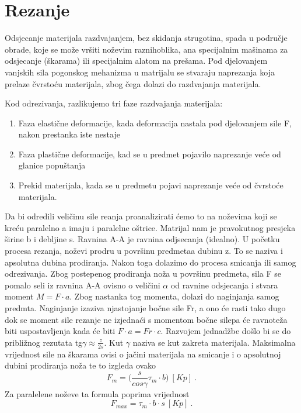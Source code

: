 \documentclass[a4paper,12pt]{article}
\numberwithin{figure}{section}
\begin{document}
\section{Rezanje}
Odsjecanje materijala razdvajanjem, bez skidanja strugotina, spada u područje obrade, koje se može vršiti noževim raznihoblika, ana specijalnim mašinama za odsjecanje (škarama) ili specijalnim alatom na prešama. Pod djelovanjem vanjskih sila pogonskog mehanizma u matrijalu se stvaraju naprezanja koja prelaze čvrstoću materijala, zbog čega dolazi do razdvajanja materijala. \par
Kod odrezivanja, razlikujemo tri faze razdvajanja materijala:
\begin{enumerate}
\item Faza elastične deformacije, kada deformacija nastala pod djelovanjem sile F, nakon prestanka iste nestaje
\item Faza plastične deformacije, kad se u predmet pojavilo naprezanje veće od glanice popuštanja
\item Prekid materijala, kada se u predmetu pojavi naprezanje veće od čvrstoće materijala. 
\end{enumerate}
Da bi odredili veličinu sile reanja proanalizirati ćemo to na noževima koji se kreću paralelno a imaju i paralelne oštrice.
Matrijal nam je pravokutnog presjeka širine b i debljine s. Ravnina A-A je ravnina odjsecanja (idealno). U početku procesa rezanja, noževi prodru u površinu predmetaa dubinu z. To se naziva i apsolutna dubina prodiranja. Nakon toga dolazimo do procesa smicanja ili samog odrezivanja. Zbog postepenog prodiranja noža u površinu predmeta, sila F se pomalo seli iz ravnina A-A ovisno o veličini $\alpha$ od ravnine odsjecanja i stvara moment $M = F \cdot a$. Zbog nastanka tog momenta, dolazi do naginjanja samog predmta. Naginjanje izaziva njastojanje bočne sile Fr, a ono će rasti tako dugo dok se moment sile rezanje ne izjednaći s momentom bočne silepa će ravnoteža biti uspostavljenja kada će biti $F\cdot a = Fr \cdot c$. Razvojem jednadžbe došlo bi se do približnog rezutata tg$\gamma\approx\frac{z}{2 s}$. Kut $\gamma$ naziva se kut zakreta materijala. Maksimalna vrijednost sile na škarama ovisi o jačini materijala na smicanje i o apsolutnoj dubini prodiranja noža te to izgleda ovako
\begin{equation}
F_{m} = \bigg(\frac{s}{cos\gamma}\tau_{m}\cdot b\bigg)\:[Kp]\:.
\end{equation}
Za paralelene noževe ta formula poprima vrijednost
\begin{equation}
F_{max} = \tau_{m}\cdot b \cdot s\:[Kp]\:.
\end{equation}
\end{document}
